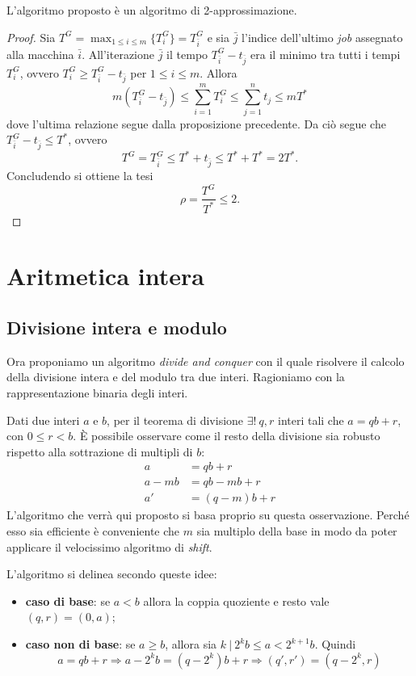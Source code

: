 \begin{proposizione}
L'algoritmo proposto è un algoritmo di 2-approssimazione.
\end{proposizione}
\begin{proof}
Sia $T^G=\max_{1\leq i\leq m}\{T_i^G\}=T_{\bar{i}}^G$ e sia $\bar{j}$ l'indice dell'ultimo \textit{job} assegnato alla macchina $\bar{i}$. All'iterazione $\bar{j}$ il tempo $T_{\bar{i}}^G-t_{\bar{j}}$ era il minimo tra tutti i tempi $T_{i}^G$, ovvero $T_i^G\geq T_{\bar{i}}^G-t_{\bar{j}}$ per $1\leq i\leq m$. Allora
\[
m(T_{\bar{i}}^G-t_{\bar{j}})\leq \sum_{i=1}^mT_i^G\leq \sum_{j=1}^nt_j\leq mT^*
\]
dove l'ultima relazione segue dalla proposizione precedente. Da ciò segue che $T_{\bar{i}}^G-t_{\bar{j}}\leq T^*$, ovvero
\[
T^G=T_{\bar{i}}^G\leq T^*+t_{\bar{j}} \leq T^*+T^*=2T^*.
\]
Concludendo si ottiene la tesi
\[
\rho = \frac{T^G}{T^*}\leq 2.
\]
\end{proof}

\section{Aritmetica intera}
\subsection{Divisione intera e modulo}
\label{sez:divisione}
Ora proponiamo un algoritmo \textit{divide and conquer} con il quale risolvere il calcolo della divisione intera e del modulo tra due interi. Ragioniamo con la rappresentazione binaria degli interi.

Dati due interi $a$ e $b$, per il teorema di divisione $\exists !\ q,r$ interi tali che $a=qb+r$, con $0\leq r<b$. È possibile osservare come il resto della divisione sia robusto rispetto alla sottrazione di multipli di $b$:
\begin{align*}
a&=qb+r \\
a-mb&=qb-mb+r \\
a'&=(q-m)b+r
\end{align*}
L'algoritmo che verrà qui proposto si basa proprio su questa osservazione. Perché esso sia efficiente è conveniente che $m$ sia multiplo della base in modo da poter applicare il velocissimo algoritmo di \textit{shift}.

L'algoritmo si delinea secondo queste idee:
\begin{itemize}
\item \textbf{caso di base}: se $a<b$ allora la coppia quoziente e resto vale $(q,r)=(0,a)$;
\item \textbf{caso non di base}: se $a\geq b$, allora sia $k\ |\ 2^kb\leq a < 2^{k+1}b$. Quindi
\[
a=qb+r \Rightarrow a-2^kb=(q-2^k)b+r \Rightarrow (q',r')=(q-2^k,r)
\]
\end{itemize}

